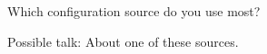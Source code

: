 \begin{assignment}
	\begin{task}
	Which configuration source do you use most?
	\end{task}

	\begin{task}
	Possible talk: About one of these sources.
	\end{task}
\end{assignment}



\nocite{raab2017introducing}

\appendix

\begin{frame}[allowframebreaks]
	
	
\end{frame}





